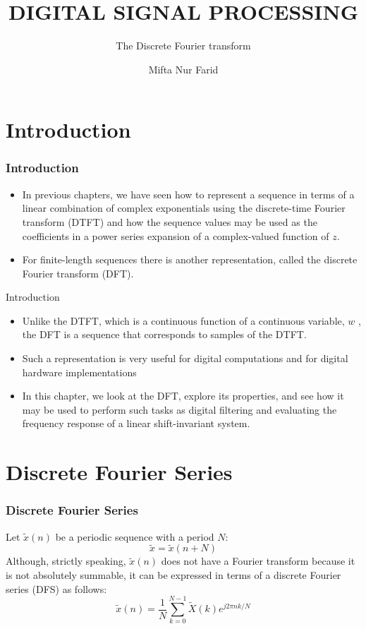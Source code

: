 \documentclass[pdflatex,compress,mathserif]{beamer}
\title{DIGITAL SIGNAL PROCESSING}
\subtitle{The Discrete Fourier transform}
\author{Mifta Nur Farid}
\begin{document}
\maketitle

\section{Introduction}

\begin{frame}
	\frametitle{Introduction}
	\begin{itemize}
		\item In previous chapters, we have seen how to represent a sequence in terms of a linear combination of complex exponentials using the discrete-time Fourier transform (DTFT) and how the sequence values may be used as the coefficients in a power series expansion of a complex-valued function of $ z $.
		\item For finite-length sequences there is another representation, called the discrete Fourier transform (DFT).
	\end{itemize}
\end{frame}

\begin{frame}{Introduction}
	\begin{itemize}
		\item Unlike the DTFT, which is a continuous function of a continuous variable, $ w $ , the DFT is a sequence that corresponds to samples of the DTFT.
		\item Such a representation is very useful for digital computations and for digital hardware implementations
		\item In this chapter, we look at the DFT, explore its properties, and see how it may be used to perform such tasks as digital filtering and evaluating the frequency response of a linear shift-invariant system.
	\end{itemize}
\end{frame}

\section{Discrete Fourier Series}

\begin{frame}
	\frametitle{Discrete Fourier Series}
	Let $ \tilde{x}(n) $ be a periodic sequence with a period $ N $:
	\begin{equation*}
		\tilde{x} = \tilde{x}(n + N)
	\end{equation*}
	Although, strictly speaking, $ \tilde{x}(n) $ does not have a Fourier transform because it is not absolutely summable, it can be expressed in terms of a discrete Fourier series (DFS) as follows:
	\begin{equation}\label{6.1}
		\tilde{x}(n) = \frac{1}{N} \sum\limits_{k=0}^{N-1} \tilde{X}(k)e^{j2 \pi nk / N}
	\end{equation}
\end{frame}
\end{document}
